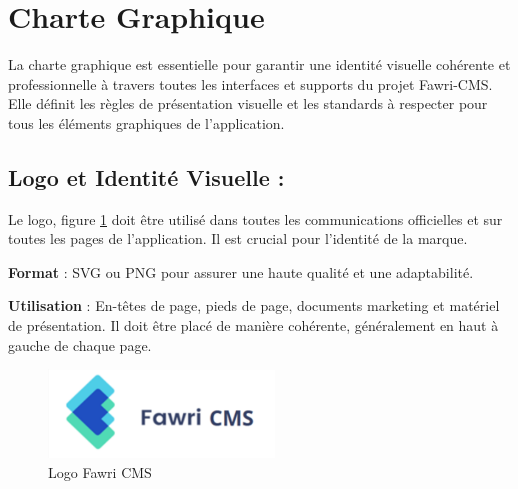 \section{Charte Graphique}

\hspace{\parindent}La charte graphique est essentielle pour garantir une identité visuelle cohérente et professionnelle à travers toutes les interfaces et supports du projet Fawri-CMS. Elle définit les règles de présentation visuelle et les standards à respecter pour tous les éléments graphiques de l'application.

\subsection{Logo et Identité Visuelle :}

\hspace{\parindent}Le logo, figure \ref*{logocms} doit être utilisé dans toutes les communications officielles et sur toutes les pages de l'application. Il est crucial pour l'identité de la marque.

\textbf{Format} : SVG ou PNG pour assurer une haute qualité et une adaptabilité.

\textbf{Utilisation} : En-têtes de page, pieds de page, documents marketing et matériel de présentation. Il doit être placé de manière cohérente, généralement en haut à gauche de chaque page.
\\
\begin{figure}[H]
  \centering
  \includegraphics[width=6cm]{Figures/fawri_cms_logo.PNG}
  \caption{Logo Fawri CMS}
  \label{logocms} %
\end{figure}


